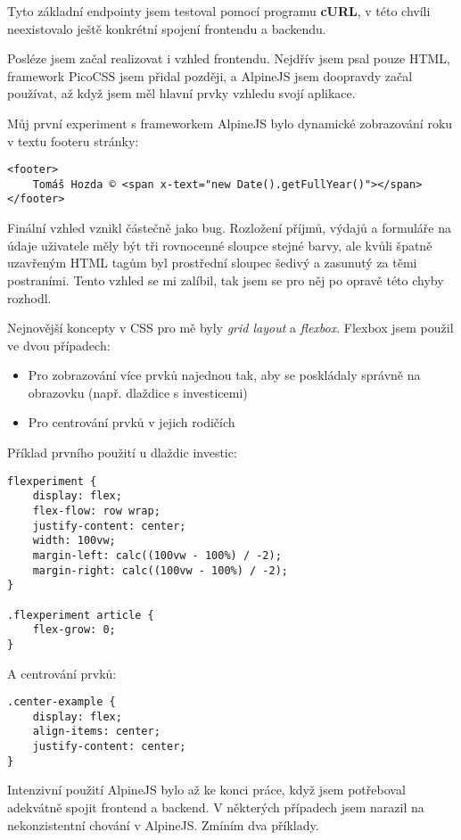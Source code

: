 \documentclass[11pt,a4paper,twoside,openright]{report}
\begin{document}
Tyto základní endpointy jsem testoval pomocí programu \textbf{cURL}, v této chvíli neexistovalo ještě konkrétní
spojení frontendu a backendu.

Posléze jsem začal realizovat i vzhled frontendu. Nejdřív jsem psal pouze HTML, framework PicoCSS jsem přidal
později, a AlpineJS jsem doopravdy začal používat, až když jsem měl hlavní prvky vzhledu svojí aplikace.

Můj první experiment s frameworkem AlpineJS bylo dynamické zobrazování roku v textu footeru stránky:

\begin{verbatim}
<footer>
    Tomáš Hozda © <span x-text="new Date().getFullYear()"></span>
</footer>
\end{verbatim}

Finální vzhled vznikl částečně jako bug. Rozložení příjmů, výdajů a formuláře na údaje uživatele měly být
tři rovnocenné sloupce stejné barvy, ale kvůli špatně uzavřeným HTML tagům byl prostřední sloupec šedivý a zasunutý
za těmi postraními. Tento vzhled se mi zalíbil, tak jsem se pro něj po opravě této chyby rozhodl.

Nejnovější koncepty v CSS pro mě byly \emph{grid layout} a \emph{flexbox}. Flexbox jsem použil ve dvou případech:

\begin{itemize}
  \item Pro zobrazování více prvků najednou tak, aby se poskládaly správně na obrazovku (např. dlaždice s investicemi)
  \item Pro centrování prvků v jejich rodičích
\end{itemize}

Příklad prvního použití u dlaždic investic:

\begin{verbatim}
flexperiment {
    display: flex;
    flex-flow: row wrap;
    justify-content: center;
    width: 100vw;
    margin-left: calc((100vw - 100%) / -2);
    margin-right: calc((100vw - 100%) / -2);
}

.flexperiment article {
    flex-grow: 0;
}
\end{verbatim}

A centrování prvků:

\begin{verbatim}
.center-example {
    display: flex;
    align-items: center;
    justify-content: center;
}
\end{verbatim}

Intenzivní použití AlpineJS bylo až ke konci práce, když jsem potřeboval adekvátně spojit frontend a backend.
V některých případech jsem narazil na nekonzistentní chování v AlpineJS. Zmíním dva příklady.
\end{document}
